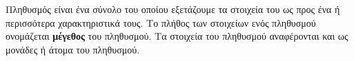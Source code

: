 Πληθυσμός είναι ένα σύνολο του οποίου εξετάζουμε τα στοιχεία του ως προς ένα ή περισσότερα χαρακτηριστικά τους. Το πλήθος των στοιχείων ενός πληθυσμού ονομάζεται \textbf{μέγεθος} του πληθυσμού. Τα στοιχεία του πληθυσμού αναφέρονται και ως μονάδες ή άτομα του πληθυσμού.
